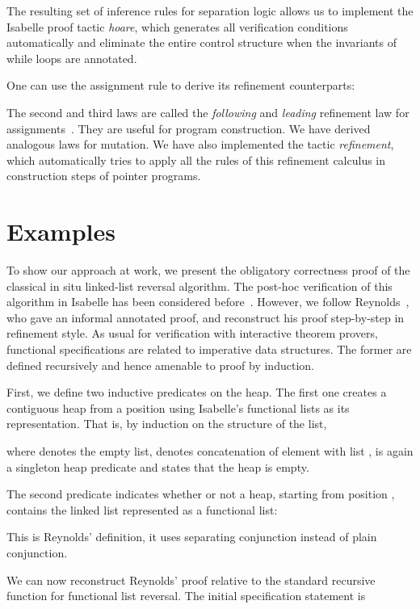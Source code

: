 \documentclass[twoside,runningheads,envcountsame,envcountsect,oribibl,orivec]{llncs}
\begin{document}
The resulting set of inference rules for separation logic allows us to
implement the Isabelle proof tactic \emph{hoare}, which generates all
verification conditions automatically and eliminate the entire control
structure when the invariants of while loops are annotated.

One can use the assignment rule to derive its refinement counterparts:

The second and third laws are called the \emph{following} and
\emph{leading} refinement law for assignments~\cite{Mor98}. They are
useful for program construction. We have derived analogous laws for
mutation. We have also implemented the tactic \emph{refinement}, which
automatically tries to apply all the rules of this refinement calculus
in construction steps of pointer programs.




\section{Examples}\label{S:examples}

To show our approach at work, we present the obligatory correctness
proof of the classical in situ linked-list reversal algorithm. The
post-hoc verification of this algorithm in Isabelle has been
considered before~\cite{MehtaN05, Weber04}.  However, we follow
Reynolds~\cite{Reynolds02}, who gave an informal annotated proof, and
reconstruct his proof step-by-step in refinement style. As usual for
verification with interactive theorem provers, functional
specifications are related to imperative data structures. The former
are defined recursively and hence amenable to proof by induction.

First, we define two inductive predicates on the heap.  The first one
creates a contiguous heap from a position  using Isabelle's
functional lists as its representation. That is, by induction on the
structure of the list,

where  denotes the empty list,  denotes
concatenation of element  with list ,  is again
a singleton heap predicate and  states that the heap is empty.

The second predicate indicates whether or not a heap, starting from position ,
contains the linked list represented as a functional list:

This is  Reynolds' definition, it uses separating conjunction
instead of plain conjunction.

We can now reconstruct Reynolds' proof relative to the standard
recursive function  for functional list reversal. The
initial specification statement is
\end{document}
